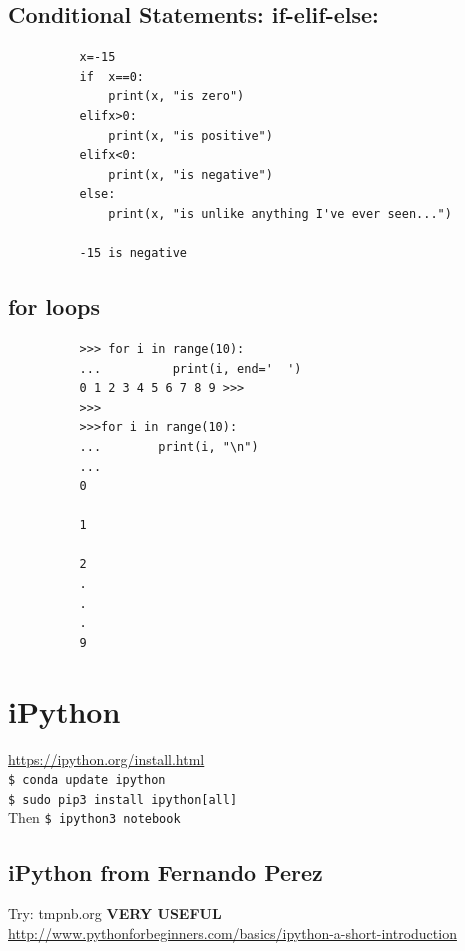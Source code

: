 \documentclass[11pt,a4paper]{article}
\begin{document}
    \subsection*{Conditional Statements: if-elif-else:}
        \begin{lstlisting}
          x=-15
          if  x==0:
              print(x, "is zero")
          elifx>0:
              print(x, "is positive")
          elifx<0:
              print(x, "is negative")
          else:
              print(x, "is unlike anything I've ever seen...")

          -15 is negative
      \end{lstlisting}


    \subsection*{for loops}
        \begin{lstlisting}
          >>> for i in range(10): 
          ...          print(i, end='  ')
          0 1 2 3 4 5 6 7 8 9 >>> 
          >>>
          >>>for i in range(10):
          ...        print(i, "\n")
          ... 
          0 
          
          1 
          
          2 
          .
          .
          .
          9 
        \end{lstlisting}


    \subsection*{}    




\newpage
\section{iPython}
\href{https://ipython.org/install.html}{https://ipython.org/install.html}\\

\smallskip
\smallskip
\noindent
{\tt \$ conda update ipython}\\

\smallskip
\smallskip
\noindent
{\tt \$ sudo pip3 install ipython[all] }\\
Then
{\tt \$ ipython3 notebook}\\

    \subsection{iPython from Fernando Perez}
    Try: tmpnb.org  {\bf VERY USEFUL}\\
    \href{http://www.pythonforbeginners.com/basics/ipython-a-short-introduction}{http://www.pythonforbeginners.com/basics/ipython-a-short-introduction}
\end{document}
